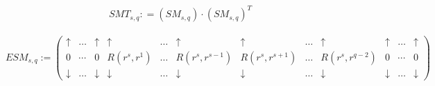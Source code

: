 \documentclass[11pt]{article}
\theoremstyle{plain}
\theoremstyle{definition}
\begin{document}
\\
\begin{equation*}
SMT_{s,q} : = (SM_{s,q}) \cdot (SM_{s,q})^T
\end{equation*}
\\
\[ ESM_{s,q} := \left( \begin{array}{cccccccccccc}
	\uparrow  & \dots  & \uparrow & \uparrow  & \dots  & \uparrow & \uparrow  & \dots  & \uparrow & \uparrow  & \dots  & \uparrow\\
	
	0 & \cdots & 0 & R(r^s, r^1) &   \dots & R(r^s, r^{s-1}) &    R(r^s, r^{s+1}) &   \dots &  R(r^s, r^{q-2}) & 0 & \cdots & 0  \\
	
	\downarrow  & \dots  & \downarrow & \downarrow  & \dots  & \downarrow & \downarrow  & \dots  & \downarrow & \downarrow  & \dots  & \downarrow  \end{array} \right)\] 
\end{document}
